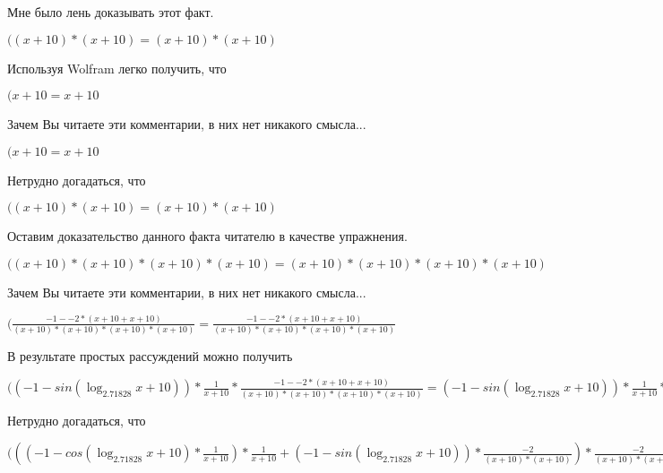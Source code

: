 \documentclass[12pt,a4paper,fleqn]{article}
\theoremstyle{definition}
\begin{document}
Мне было лень доказывать этот факт.

$(( x  +  10 ) * ( x  +  10 ) = ( x  +  10 ) * ( x  +  10 )$

Используя Wolfram легко получить, что

$( x  +  10  =  x  +  10 $

Зачем Вы читаете эти комментарии, в них нет никакого смысла...

$( x  +  10  =  x  +  10 $

Нетрудно догадаться, что

$(( x  +  10 ) * ( x  +  10 ) = ( x  +  10 ) * ( x  +  10 )$

Оставим доказательство данного факта читателю в качестве упражнения.

$(( x  +  10 ) * ( x  +  10 ) * ( x  +  10 ) * ( x  +  10 ) = ( x  +  10 ) * ( x  +  10 ) * ( x  +  10 ) * ( x  +  10 )$

Зачем Вы читаете эти комментарии, в них нет никакого смысла...

$(\frac{ -1  -  -2  * ( x  +  10  +  x  +  10 )}{( x  +  10 ) * ( x  +  10 ) * ( x  +  10 ) * ( x  +  10 )}
 = \frac{ -1  -  -2  * ( x  +  10  +  x  +  10 )}{( x  +  10 ) * ( x  +  10 ) * ( x  +  10 ) * ( x  +  10 )}
$

В результате простых рассуждений можно получить

$(( -1  - sin(\log_{ 2.71828 }{ x  +  10 })) * \frac{ 1 }{ x  +  10 }
 * \frac{ -1  -  -2  * ( x  +  10  +  x  +  10 )}{( x  +  10 ) * ( x  +  10 ) * ( x  +  10 ) * ( x  +  10 )}
 = ( -1  - sin(\log_{ 2.71828 }{ x  +  10 })) * \frac{ 1 }{ x  +  10 }
 * \frac{ -1  -  -2  * ( x  +  10  +  x  +  10 )}{( x  +  10 ) * ( x  +  10 ) * ( x  +  10 ) * ( x  +  10 )}
$

Нетрудно догадаться, что

$((( -1  - cos(\log_{ 2.71828 }{ x  +  10 }) * \frac{ 1 }{ x  +  10 }
) * \frac{ 1 }{ x  +  10 }
 + ( -1  - sin(\log_{ 2.71828 }{ x  +  10 })) * \frac{ -2 }{( x  +  10 ) * ( x  +  10 )}
) * \frac{ -2 }{( x  +  10 ) * ( x  +  10 )}
 + ( -1  - sin(\log_{ 2.71828 }{ x  +  10 })) * \frac{ 1 }{ x  +  10 }
 * \frac{ -1  -  -2  * ( x  +  10  +  x  +  10 )}{( x  +  10 ) * ( x  +  10 ) * ( x  +  10 ) * ( x  +  10 )}
 = (( -1  - cos(\log_{ 2.71828 }{ x  +  10 }) * \frac{ 1 }{ x  +  10 }
) * \frac{ 1 }{ x  +  10 }
 + ( -1  - sin(\log_{ 2.71828 }{ x  +  10 })) * \frac{ -2 }{( x  +  10 ) * ( x  +  10 )}
) * \frac{ -2 }{( x  +  10 ) * ( x  +  10 )}
 + ( -1  - sin(\log_{ 2.71828 }{ x  +  10 })) * \frac{ 1 }{ x  +  10 }
 * \frac{ -1  -  -2  * ( x  +  10  +  x  +  10 )}{( x  +  10 ) * ( x  +  10 ) * ( x  +  10 ) * ( x  +  10 )}
$
\end{document}
